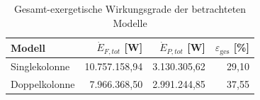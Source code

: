 \begin{table}[htbp]
\centering
\caption{Gesamt-exergetische Wirkungsgrade der betrachteten Modelle}
\label{tab:gesamt_exergetische_wirkungsgrade}
\begin{tabular}{lrrr}
\hline
Modell & $\dot E_{F,tot}$ [W] & $\dot E_{P,tot}$ [W] & $\varepsilon_\mathrm{ges}$ [\%] \\
\hline
Singlekolonne & 10.757.158,94 & 3.130.305,62 & 29,10 \\
Doppelkolonne & 7.966.368,50 & 2.991.244,85 & 37,55 \\
\hline
\end{tabular}
\end{table}